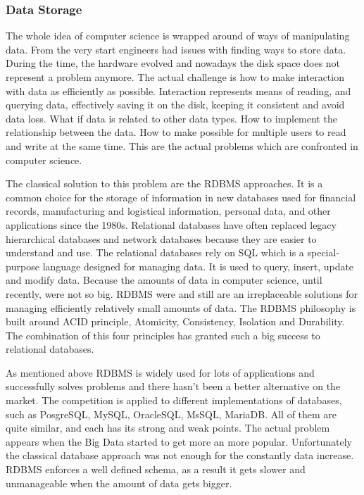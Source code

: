 \subsubsection{Data Storage}
The whole idea of computer science is wrapped around of ways of manipulating data. From the very start engineers had issues with finding ways to store data. During the time, the hardware evolved and nowadays the disk space does not represent a problem anymore. The actual challenge is how to make interaction with data as efficiently as possible. Interaction represents means of reading, and querying data, effectively saving it on the disk, keeping it consistent and avoid data loss. What if data is related to other data types. How to  implement the relationship between the data. How to make possible for multiple users to read and write at the same time. This are the actual problems which are confronted in computer science.

The classical solution to this problem are the RDBMS approaches. It is a common choice for the storage of information in new databases used for financial records, manufacturing and logistical information, personal data, and other applications since the 1980s. Relational databases have often replaced legacy hierarchical databases and network databases because they are easier to understand and use. The relational databases rely on SQL which is a special-purpose language designed for managing data. It is used to query, insert, update and modify data. Because the amounts of data in computer science, until recently, were not so big. RDBMS were and still are an irreplaceable solutions for managing efficiently relatively small amounts of data. The RDBMS philosophy is built around ACID principle, Atomicity, Consistency, Isolation and Durability. The combination of this four principles has granted such a big success to relational databases.

As mentioned above RDBMS is widely used for lots of applications and successfully solves problems and there hasn't been a better alternative on the market. The competition is applied to different implementations of databases, such as PosgreSQL, MySQL, OracleSQL, MsSQL, MariaDB. All of them are quite similar, and each has its strong and weak points. The actual problem appears when the Big Data started to get more an more popular. Unfortunately the classical database approach was not enough for the constantly data increase. RDBMS enforces a well defined schema, as a result it gets slower and unmanageable when the amount of data gets bigger.

